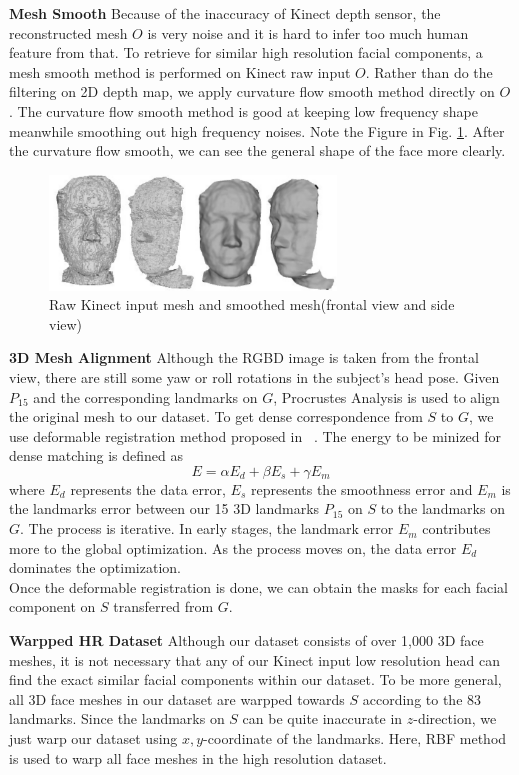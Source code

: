 \documentclass[annual]{acmsiggraph}
\begin{document}
\textbf{Mesh Smooth} Because of the inaccuracy of Kinect depth sensor, the reconstructed mesh $O$ is very noise and it is hard to infer too much human feature from that. To retrieve for similar high resolution facial components, a mesh smooth method is performed on Kinect raw input $O$. Rather than do the filtering on 2D depth map, we apply curvature flow smooth method directly on $O$. The curvature flow smooth method is good at keeping low frequency shape meanwhile smoothing out high frequency noises. Note the Figure in Fig. \ref{smoothed}. After the curvature flow smooth, we can see the general shape of the face more clearly.

\begin{figure}[ht]
\centering
\includegraphics[width=3in]{images/smoothed}
\caption{Raw Kinect input mesh and smoothed mesh(frontal view and side view)}\label{smoothed}
\end{figure}

\textbf{3D Mesh Alignment} Although the RGBD image is taken from the frontal view, there are still some yaw or roll rotations in the subject's head pose. Given $P_{15}$ and the corresponding landmarks on $G$, Procrustes Analysis is used to align the original mesh to our dataset. 
To get dense correspondence from $S$ to $G$, we use deformable registration method proposed in ~\cite{allen}. The energy to be minized for dense matching is defined as
\begin{equation}
E={\alpha}E_d+{\beta}E_s+{\gamma}E_m
\end{equation}
where $E_d$ represents the data error, $E_s$ represents the smoothness error and $E_m$ is the landmarks error between our 15 3D landmarks $P_{15}$ on $S$ to the landmarks on $G$. The process is iterative. In early stages, the landmark error $E_m$ contributes more to the global optimization. As the process moves on, the data error $E_d$ dominates the optimization.\\
Once the deformable registration is done, we can obtain the masks for each facial component on $S$ transferred from $G$.

\textbf{Warpped HR Dataset} Although our dataset consists of over 1,000 3D face meshes, it is not necessary that any of our Kinect input low resolution head can find the exact similar facial components within our dataset. To be more general, all 3D face meshes in our dataset are warpped towards $S$ according to the 83 landmarks. Since the landmarks on $S$ can be quite inaccurate in $z$-direction, we just warp our dataset using $x,y$-coordinate of the landmarks. Here, RBF method is used to warp all face meshes in the high resolution dataset.
\end{document}

